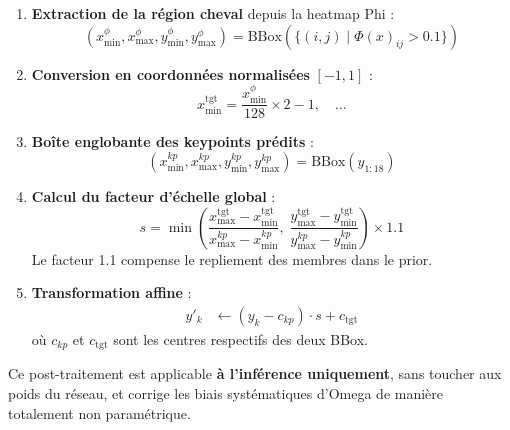 \documentclass[12pt,a4paper]{article}
\begin{document}
\begin{enumerate}
  \item \textbf{Extraction de la région cheval} depuis la heatmap Phi :
        \begin{equation}
          (x_{\min}^{\phi}, x_{\max}^{\phi}, y_{\min}^{\phi}, y_{\max}^{\phi})
          = \text{BBox}(\{(i,j) \mid \Phi(x)_{ij} > 0.1\})
        \end{equation}

  \item \textbf{Conversion en coordonnées normalisées} $[-1,1]$ :
        \begin{equation}
          x_{\min}^{\text{tgt}} = \frac{x_{\min}^{\phi}}{128} \times 2 - 1, \quad \ldots
        \end{equation}

  \item \textbf{Boîte englobante des keypoints prédits} :
        \begin{equation}
          (x_{\min}^{kp}, x_{\max}^{kp}, y_{\min}^{kp}, y_{\max}^{kp})
          = \text{BBox}(y_{1:18})
        \end{equation}

  \item \textbf{Calcul du facteur d'échelle global} :
        \begin{equation}
          s = \min\!\left(
              \frac{x_{\max}^{\text{tgt}} - x_{\min}^{\text{tgt}}}{x_{\max}^{kp} - x_{\min}^{kp}},\;
              \frac{y_{\max}^{\text{tgt}} - y_{\min}^{\text{tgt}}}{y_{\max}^{kp} - y_{\min}^{kp}}
              \right) \times 1.1
        \end{equation}
        Le facteur 1.1 compense le repliement des membres dans le prior.

  \item \textbf{Transformation affine} :
        \begin{align}
          y'_k &\leftarrow (y_k - c_{kp}) \cdot s + c_{\text{tgt}}
        \end{align}
        où $c_{kp}$ et $c_{\text{tgt}}$ sont les centres respectifs des deux BBox.
\end{enumerate}

\begin{infobox}
  Ce post-traitement est applicable \textbf{à l'inférence uniquement}, sans toucher
  aux poids du réseau, et corrige les biais systématiques d'Omega de manière
  totalement non paramétrique.
\end{infobox}
\end{document}
